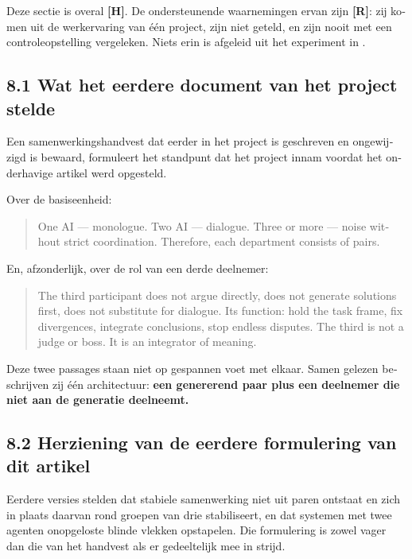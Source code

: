 \begin{dutch}
Deze sectie is overal \textbf{[H]}. De ondersteunende waarnemingen ervan zijn \textbf{[R]}: zij komen uit de werkervaring van één project, zijn niet geteld, en zijn nooit met een controleopstelling vergeleken. Niets erin is afgeleid uit het experiment in .


\subsection*{8.1 Wat het eerdere document van het project stelde}
\label{sec:nl:8.1}

Een samenwerkingshandvest dat eerder in het project is geschreven en ongewijzigd is bewaard, formuleert het standpunt dat het project innam voordat het onderhavige artikel werd opgesteld.

Over de basiseenheid:

\begin{quote}
One AI — monologue. Two AI — dialogue. Three or more — noise without strict coordination. Therefore, each department consists of pairs.
\end{quote}
En, afzonderlijk, over de rol van een derde deelnemer:

\begin{quote}
The third participant does not argue directly, does not generate solutions first, does not substitute for dialogue. Its function: hold the task frame, fix divergences, integrate conclusions, stop endless disputes. The third is not a judge or boss. It is an integrator of meaning.
\end{quote}
Deze twee passages staan niet op gespannen voet met elkaar. Samen gelezen beschrijven zij één architectuur: \textbf{een genererend paar plus een deelnemer die niet aan de generatie deelneemt.}


\subsection*{8.2 Herziening van de eerdere formulering van dit artikel}
\label{sec:nl:8.2}

Eerdere versies stelden dat stabiele samenwerking niet uit paren ontstaat en zich in plaats daarvan rond groepen van drie stabiliseert, en dat systemen met twee agenten onopgeloste blinde vlekken opstapelen. Die formulering is zowel vager dan die van het handvest als er gedeeltelijk mee in strijd.


\end{dutch}
